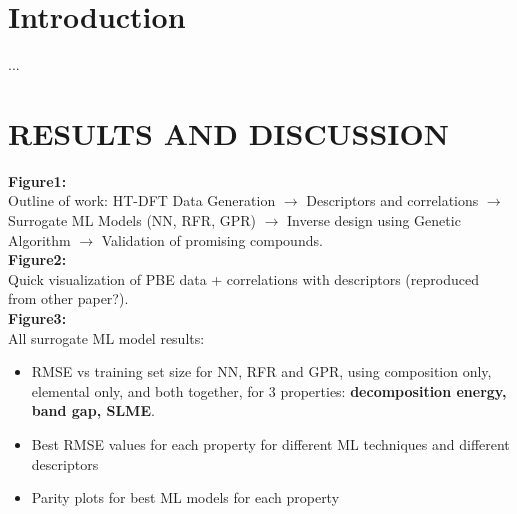 \documentclass[aip, jmp, amsmath, amssymb, preprint]{revtex4-2}
\begin{document}
\section*{Introduction}

... \\



\section*{RESULTS AND DISCUSSION}

\textbf{Figure1:} \\
Outline of work: HT-DFT Data Generation $\rightarrow$ Descriptors and correlations $\rightarrow$ Surrogate ML Models (NN, RFR, GPR) $\rightarrow$ Inverse design using Genetic Algorithm $\rightarrow$ Validation of promising compounds. \\

\textbf{Figure2:} \\
Quick visualization of PBE data + correlations with descriptors (reproduced from other paper?). \\

\textbf{Figure3:} \\
All surrogate ML model results: 
\begin{itemize}
\item RMSE vs training set size for NN, RFR and GPR, using composition only, elemental only, and both together, for 3 properties: \textbf{decomposition energy, band gap, SLME}.
\item Best RMSE values for each property for different ML techniques and different descriptors
\item Parity plots for best ML models for each property
\end{itemize} \\
\end{document}
